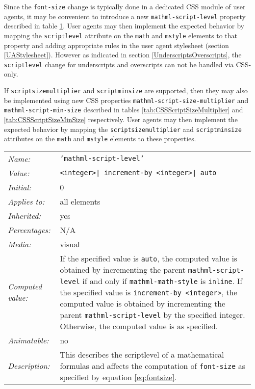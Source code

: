 Since the {\tt font-size} change is typically done in a dedicated CSS module of
user agents, it may be convenient to introduce a new
{\tt mathml-script-level} property described in table \ref{tab:CSSScriptLevel}.
User agents may then implement the expected behavior by mapping the
{\tt scriptlevel} attribute on the {\tt math} and {\tt mstyle} elements to that
property and adding appropriate rules in the user agent stylesheet
(section \ref{UAStylesheet}). However as indicated in section
\ref{UnderscriptsOverscripts}, the {\tt scriptlevel} change for underscripts
and overscripts can not be handled via CSS-only.

If {\tt scriptsizemultiplier} and {\tt scriptminsize}
are supported, then they may also be implemented using new CSS properties
{\tt mathml-script-size-multiplier} and {\tt mathml-script-min-size}
described in tables \ref{tab:CSSScriptSizeMultiplier} and
\ref{tab:CSSScriptSizeMinSize} respectively. User agents may then implement
the expected behavior by mapping the {\tt scriptsizemultiplier}
and {\tt scriptminsize} attributes on the {\tt math} and {\tt mstyle} elements
to these properties.

\begin{table}
\begin{tabular}{ll}
  \emph{Name:} & {\tt 'mathml-script-level'} \\
  \emph{Value:} &
       {\tt \textless integer\textgreater |
         increment-by \textless integer\textgreater | auto} \\
  \emph{Initial:} & 0 \\
  \emph{Applies to:} & all elements \\
  \emph{Inherited:} & yes \\
  \emph{Percentages:} & N/A \\
  \emph{Media:} & visual \\
  \emph{Computed value:} &
  If the specified value is {\tt auto}, the computed value is obtained by
  incrementing the parent {\tt mathml-script-level} if and only if
  {\tt mathml-math-style} is {\tt inline}.
  If the specified value is {\tt increment-by \textless integer\textgreater},
  the computed value is obtained by
  incrementing the parent {\tt mathml-script-level} by the specified integer.
  Otherwise, the computed value is as specified. \\
  \emph{Animatable:} & no \\
  \emph{Description:} & This describes the scriptlevel of a mathematical
  formulas and affects the computation of {\tt font-size} as specified by
  equation \ref{eq:fontsize}.
\end{tabular}
\label{tab:CSSScriptLevel}
\end{table}

